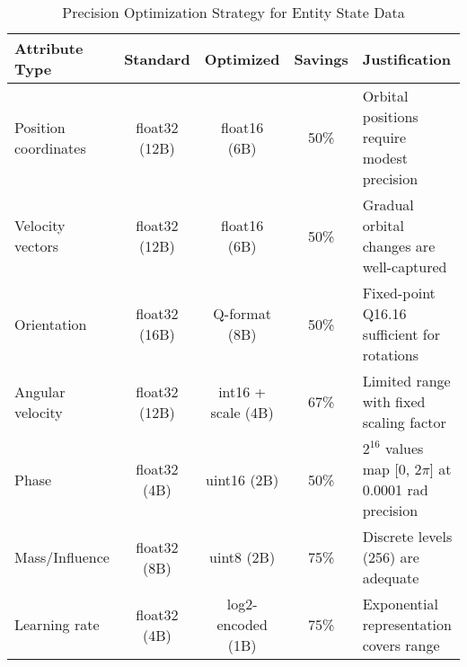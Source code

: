 \begin{table}[h]
\centering
\begin{tabular}{|l|c|c|c|l|}
\hline
\textbf{Attribute Type} & \textbf{Standard} & \textbf{Optimized} & \textbf{Savings} & \textbf{Justification} \\
\hline
Position coordinates & float32 (12B) & float16 (6B) & 50\% & Orbital positions require modest precision \\
\hline
Velocity vectors & float32 (12B) & float16 (6B) & 50\% & Gradual orbital changes are well-captured \\
\hline
Orientation & float32 (16B) & Q-format (8B) & 50\% & Fixed-point Q16.16 sufficient for rotations \\
\hline
Angular velocity & float32 (12B) & int16 + scale (4B) & 67\% & Limited range with fixed scaling factor \\
\hline
Phase & float32 (4B) & uint16 (2B) & 50\% & $2^{16}$ values map [0, $2\pi$] at 0.0001 rad precision \\
\hline
Mass/Influence & float32 (8B) & uint8 (2B) & 75\% & Discrete levels (256) are adequate \\
\hline
Learning rate & float32 (4B) & log2-encoded (1B) & 75\% & Exponential representation covers range \\
\hline
\end{tabular}
\caption{Precision Optimization Strategy for Entity State Data}
\end{table}

